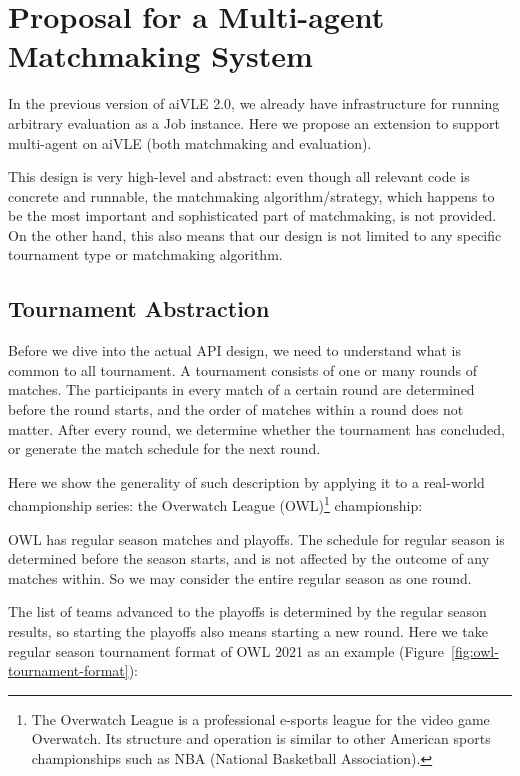 \chapter{Proposal for a Multi-agent Matchmaking System}
\label{appendix:aivle-web_matchmaking}

In the previous version of aiVLE 2.0, we already have infrastructure for running arbitrary evaluation as a Job instance. Here we propose an extension to support multi-agent on aiVLE (both matchmaking and evaluation).

This design is very high-level and abstract: even though all relevant code is concrete and runnable, the matchmaking algorithm/strategy, which happens to be the most important and sophisticated part of matchmaking, is not provided. On the other hand, this also means that our design is not limited to any specific tournament type or matchmaking algorithm.

\section{Tournament Abstraction}
\label{as:matchmaking-api_design-tournament_abstraction}
Before we dive into the actual API design, we need to understand what is common to all tournament. A tournament consists of one or many rounds of matches. The participants in every match of a certain round are determined before the round starts, and the order of matches within a round does not matter. After every round, we determine whether the tournament has concluded, or generate the match schedule for the next round.

Here we show the generality of such description by applying it to a real-world championship series: the Overwatch League (OWL)\footnote{The Overwatch League is a professional e-sports league for the video game Overwatch. Its structure and operation is similar to other American sports championships such as NBA (National Basketball Association).} championship:

OWL has regular season matches and playoffs. The schedule for regular season is determined before the season starts, and is not affected by the outcome of any matches within. So we may consider the entire regular season as one round.

The list of teams advanced to the playoffs is determined by the regular season results, so starting the playoffs also means starting a new round. Here we take regular season tournament format of OWL 2021 as an example (Figure~\ref{fig:owl-tournament-format}):

